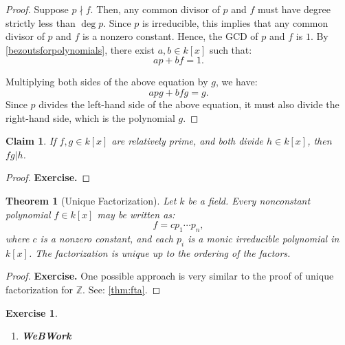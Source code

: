 \documentclass[a4paper,12pt]{report}
\newcounter{statement}
\numberwithin{statement}{chapter}
\newtheorem{thm}[statement]{Theorem}
\newtheorem{claim}[statement]{Claim}
\newtheorem{ex}[statement]{\bf Exercise}
\numberwithin{equation}{chapter}
\numberwithin{section}{chapter}
\numberwithin{subsection}{section}
\begin{document}
\begin{proof}

Suppose $p \nmid f$.
Then, any common divisor of $p$ and $f$ must have degree strictly less than $\deg p$.
Since $p$ is irreducible, this implies that any common divisor of $p$ and $f$ is a nonzero constant.
Hence, the GCD of $p$ and $f$ is $1$.
By \cref{bezoutsforpolynomials}, there exist $a, b \in k[x]$ such that:
\[
ap + bf = 1.
\]

Multiplying both sides of the above equation by $g$, we have:
\[
apg + bfg = g.
\]
Since $p$ divides the left-hand side of the above equation, it must
also divide the right-hand side, which is the polynomial $g$.


\end{proof}



\begin{claim}

If $f, g \in k[x]$ are relatively prime, and both divide $h \in k[x]$,
then $fg | h$.
\end{claim}
\begin{proof}

 {\bf Exercise.} 

\end{proof}


\begin{thm}[Unique Factorization]


Let $k$ be a field.
Every nonconstant polynomial $f \in k[x]$ may be written as:
\[
f = c p_1\cdots p_n,
\]
where $c$ is a nonzero constant,
and each $p_i$ is a monic irreducible polynomial in $k[x]$.
The factorization is unique up to the ordering of the factors.
\end{thm}
\begin{proof}

 {\bf Exercise.} 
One possible approach is very similar to the proof of unique factorization
for $\mathbb{Z}$. See: \cref{thm:fta}.
\end{proof}




\begin{ex}
\begin{enumerate}
\item  
{\bf WeBWork}
\end{enumerate}
\end{ex}
\end{document}
